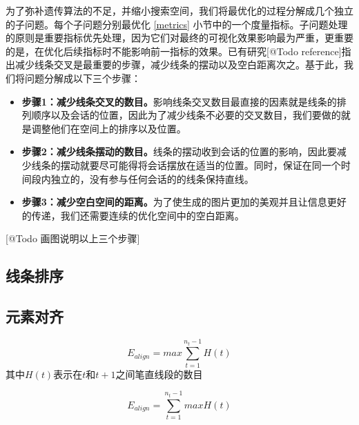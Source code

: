 为了弥补遗传算法的不足，并缩小搜索空间，我们将最优化的过程分解成几个独立的子问题。每个子问题分别最优化 \ref{metrics} 小节中的一个度量指标。子问题处理的原则是重要指标优先处理，因为它们对最终的可视化效果影响最为严重，更重要的是，在优化后续指标时不能影响前一指标的效果。已有研究[@Todo reference]指出减少线条交叉是最重要的步骤，减少线条的摆动以及空白距离次之。基于此，我们将问题分解成以下三个步骤：
\begin{itemize}
\item \textbf{步骤1：减少线条交叉的数目。}影响线条交叉数目最直接的因素就是线条的排列顺序以及会话的位置，因此为了减少线条不必要的交叉数目，我们要做的就是调整他们在空间上的排序以及位置。
\item \textbf{步骤2：减少线条摆动的数目。}线条的摆动收到会话的位置的影响，因此要减少线条的摆动就要尽可能得将会话摆放在适当的位置。同时，保证在同一个时间段内独立的，没有参与任何会话的的线条保持直线。
\item \textbf{步骤3：减少空白空间的距离。}为了使生成的图片更加的美观并且让信息更好的传递，我们还需要连续的优化空间中的空白距离。
\end{itemize}
 
 [@Todo 画图说明以上三个步骤]
 
\subsection{线条排序}

\subsection{元素对齐}
\begin{equation}
E_{align} = max \sum_{t=1}^{n_t-1} H\left(t\right)
\end{equation}
其中$H\left(t\right)$表示在$t$和$t+1$之间笔直线段的数目

\begin{equation}
E_{align} = \sum_{t=1}^{n_t-1} max H\left(t\right)
\end{equation}


